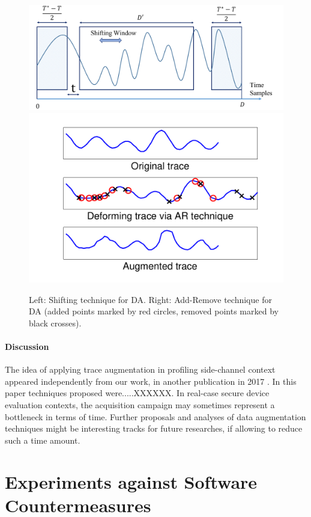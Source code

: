 \begin{figure}[t]
\includegraphics[width=.5\textwidth, height=0.13\textheight]{../Figures/CHES2017/Shifting_window.pdf}
\includegraphics[width=.5\textwidth, height=0.13\textheight]{../Figures/CHES2017/AR_example.pdf}
\caption{Left: Shifting technique for DA. Right: Add-Remove technique for DA (added points marked by red circles, removed points marked by black crosses).}\label{fig:DA}
\end{figure}

\paragraph*{Discussion}
The idea of applying trace augmentation in profiling side-channel context appeared independently from our work, in another publication in 2017 \cite{pu2017trace}. In this paper techniques proposed were.....XXXXXX. In real-case secure device evaluation contexts, the acquisition campaign may sometimes represent a bottleneck in terms of time. Further proposals and analyses of data augmentation techniques might be interesting tracks for future researches, if allowing to reduce such a time amount.



\section{Experiments against Software Countermeasures}

